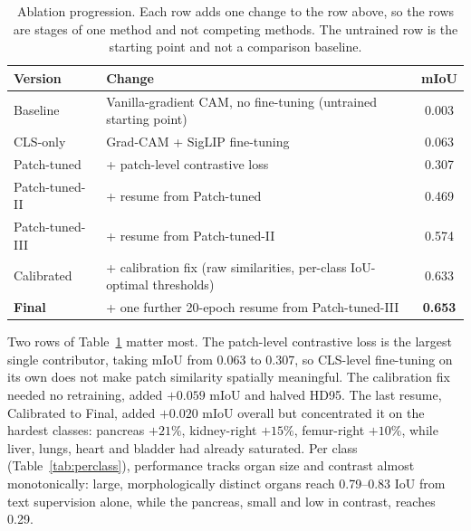 \documentclass[10pt]{article}
\begin{document}
\begin{table}[!htbp]
\centering
\caption{Ablation progression. Each row adds one change to the row above, so the
rows are stages of one method and not competing methods. The untrained row is the
starting point and not a comparison baseline.}
\label{tab:progression}
\begin{tabular}{llc}
\toprule
Version & Change & mIoU \\
\midrule
Baseline         & Vanilla-gradient CAM, no fine-tuning (untrained starting point) & 0.003 \\
CLS-only         & Grad-CAM + SigLIP fine-tuning                                   & 0.063 \\
Patch-tuned         & \quad + patch-level contrastive loss                            & 0.307 \\
Patch-tuned-II         & \quad + resume from Patch-tuned                                          & 0.469 \\
Patch-tuned-III         & \quad + resume from Patch-tuned-II                                          & 0.574 \\
Calibrated   & \quad + calibration fix (raw similarities, per-class IoU-optimal thresholds) & 0.633 \\
\textbf{Final} & \quad + one further 20-epoch resume from
Patch-tuned-III              & \textbf{0.653} \\
\bottomrule
\end{tabular}
\end{table}

Two rows of Table~\ref{tab:progression} matter most. The patch-level contrastive
loss is the largest single contributor, taking mIoU from 0.063 to 0.307, so
CLS-level fine-tuning on its own does not make patch similarity spatially
meaningful. The calibration fix needed no retraining, added $+0.059$ mIoU and
halved HD95. The last resume, Calibrated to Final, added $+0.020$ mIoU overall
but concentrated it on the hardest classes: pancreas $+21\%$, kidney-right
$+15\%$, femur-right $+10\%$, while liver, lungs, heart and bladder had already
saturated. Per class (Table~\ref{tab:perclass}), performance tracks organ size and
contrast almost monotonically: large, morphologically distinct organs reach
0.79--0.83 IoU from text supervision alone, while the pancreas, small and low
in contrast, reaches 0.29.
\end{document}
